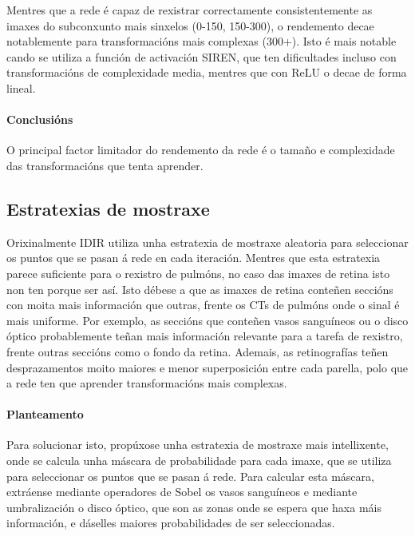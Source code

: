 Mentres que a rede é capaz de rexistrar correctamente consistentemente as imaxes do subconxunto mais sinxelos (0-150, 150-300), o rendemento decae notablemente para transformacións mais complexas (300+). 
Isto é mais notable cando se utiliza a función de activación SIREN, que ten dificultades incluso con transformacións de complexidade media, mentres que con ReLU o decae de forma lineal.

\paragraph{Conclusións}
\label{par:Conclusions-batchsize}

O principal factor limitador do rendemento da rede é o tamaño e complexidade das transformacións que tenta aprender.

\subsection{Estratexias de mostraxe}
\label{subsec:Estratexias de mostraxe}

Orixinalmente IDIR utiliza unha estratexia de mostraxe aleatoria para seleccionar os puntos que se pasan á rede en cada iteración.
Mentres que esta estratexia parece suficiente para o rexistro de pulmóns, no caso das imaxes de retina isto non ten porque ser así.
Isto débese a que as imaxes de retina conteñen seccións con moita mais información que outras, frente os CTs de pulmóns onde o sinal é mais uniforme.
Por exemplo, as seccións que conteñen vasos sanguíneos ou o disco óptico probablemente teñan mais información relevante para a tarefa de rexistro, frente outras seccións como o fondo da retina.
Ademais, as retinografías teñen desprazamentos moito maiores e menor superposición entre cada parella, polo que a rede ten que aprender transformacións mais complexas.

\paragraph{Planteamento}
\label{par:Planteamento-sampling}

Para solucionar isto, propúxose unha estratexia de mostraxe mais intellixente, onde se calcula unha máscara de probabilidade para cada imaxe, que se utiliza para seleccionar os puntos que se pasan á rede.
Para calcular esta máscara, extráense mediante operadores de Sobel os vasos sanguíneos e mediante umbralización o disco óptico, que son as zonas onde se espera que haxa máis información, e dáselles maiores probabilidades de ser seleccionadas.

